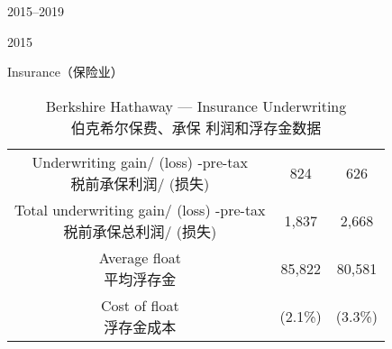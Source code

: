 \begin{chapter}{2015--2019}
\begin{section}{2015}
\begin{subsection}{Insurance（保险业）}
\begin{table}[!htbp]
\begin{center}
\begin{tabular}{ccc}
      \makecell[c]{Underwriting gain/ (loss) -pre-tax \\ 税前承保利润/ (损失)} & 824 & 626 \\
      \makecell[c]{Total underwriting gain/ (loss) -pre-tax \\ 税前承保总利润/ (损失)} & 1,837 & 2,668 \\
      \makecell[c]{Average float \\ 平均浮存金} & 85,822 & 80,581 \\
      \makecell[c]{Cost of float \\ 浮存金成本} & (2.1\%) & (3.3\%) \\
      \bottomrule
    \end{tabular}
    \caption{Berkshire Hathaway --- Insurance Underwriting \\ 伯克希尔保费、承保
      利润和浮存金数据}
  \end{center}
\end{table}
\end{subsection}


\end{section}
\end{chapter}
